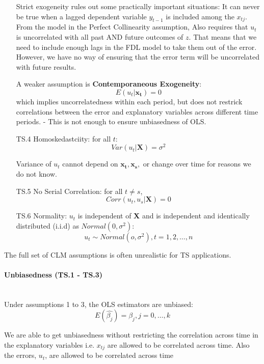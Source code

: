 \documentclass[11pt]{article}
\begin{document}
\begin{shaded}
\begin{enumerate}
    \begin{note}
        Strict exogeneity rules out some practically important situations: It can never be true when a lagged dependent variable $y_{t-1}$ is included among the $x_{tj}$. From the model in the Perfect Collinearity assumption, Also requires that $u_t$ is uncorrelated with all past AND future outcomes of $z$. That means that we need to include enough lags in the FDL model to take them out of the error. However, we have no way of ensuring that the error term will be uncorrelated with future results.
    \end{note}

    A weaker assumption is \textbf{Contemporaneous Exogeneity}:
    \[E(u_t|\boldsymbol{x_t}) = 0\]
    which implies uncorrelatedness within each period, but does not restrick correlations between the error and explanatory variables across different time periods. - This is not enough to ensure unbiasedness of OLS.

    \item [TS.4] Homoskedastciity: for all $t$:
    \[Var(u_t|\boldsymbol{X}) = \sigma^2\]

    Variance of $u_t$ cannot depend on $\boldsymbol{x_t, x_s}, $ or change over time for reasons we do not know.

    \item [TS.5] No Serial Correlation: for all $t \neq s$, %
    \[Corr(u_t, u_s | \boldsymbol{X}) = 0\]

    \item [TS.6] Normality: $u_t$ is independent of \textbf{X} and is independent and identically distributed (i.i.d) as $Normal(0,\sigma^2):$
    \[u_t \sim Normal(o, \sigma^2), t= 1, 2, \ldots, n\]
\end{enumerate}

The full set of CLM assumptions is often unrealistic for TS applications.
\end{shaded}

\paragraph{Unbiasedness (TS.1 - TS.3)} \mbox{} \\
Under assumptions 1 to 3, the OLS estimators are unbiased:
\[E(\hat{\beta_j}) = \beta_j, j = 0, \ldots, k\]

We are able to get unbiasedness without restricting the correlation across time in the explanatory variables i.e. $x_{tj}$ are allowed to be correlated across time. Also the errors, $u_t$, are allowed to be correlated across time
\end{document}
